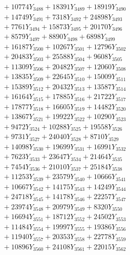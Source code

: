 \documentclass[a4paper,10pt]{article}
\begin{document}
{\begin{align}
&\;  + 10774 Y_{3488} + 18391 Y_{3489} + 18919 Y_{3490} \\[0.3ex]
&\;  + 14749 Y_{3491} + 7318 Y_{3492} + 24898 Y_{3493} \\[0.3ex]
&\;  + 7761 Y_{3494} + 15873 Y_{3495} + 20170 Y_{3496} \\[0.3ex]
&\;  + 8579 Y_{3497} + 8890 Y_{3498} + 6898 Y_{3499} \\[0.3ex]
&\;  + 16187 Y_{3500} + 10267 Y_{3501} + 12796 Y_{3502} \\[0.3ex]
&\;  + 20483 Y_{3503} + 25588 Y_{3504} + 9608 Y_{3505} \\[0.3ex]
&\;  + 11309 Y_{3506} + 20482 Y_{3507} + 12060 Y_{3508} \\[0.5ex]\allowbreak
&\;  + 13835 Y_{3509} + 22645 Y_{3510} + 15009 Y_{3511} \\[0.3ex]
&\;  + 15389 Y_{3512} + 20432 Y_{3513} + 13587 Y_{3514} \\[0.3ex]
&\;  + 16164 Y_{3515} + 17885 Y_{3516} + 21722 Y_{3517} \\[0.3ex]
&\;  + 17877 Y_{3518} + 16605 Y_{3519} + 14482 Y_{3520} \\[0.3ex]
&\;  + 13867 Y_{3521} + 19922 Y_{3522} + 10290 Y_{3523} \\[0.3ex]
&\;  + 9472 Y_{3524} + 10288 Y_{3525} + 19558 Y_{3526} \\[0.3ex]
&\;  + 9731 Y_{3527} + 24040 Y_{3528} + 8710 Y_{3529} \\[0.3ex]
&\;  + 14098 Y_{3530} + 19699 Y_{3531} + 16991 Y_{3532} \\[0.3ex]
&\;  + 7623 Y_{3533} + 23647 Y_{3534} + 21464 Y_{3535} \\[0.3ex]
&\;  + 7454 Y_{3536} + 21010 Y_{3537} + 25184 Y_{3538} \\[0.5ex]\allowbreak
&\;  + 11253 Y_{3539} + 23579 Y_{3540} + 10666 Y_{3541} \\[0.3ex]
&\;  + 10667 Y_{3542} + 14175 Y_{3543} + 14249 Y_{3544} \\[0.3ex]
&\;  + 24718 Y_{3545} + 14178 Y_{3546} + 22257 Y_{3547} \\[0.3ex]
&\;  + 23974 Y_{3548} + 20979 Y_{3549} + 8320 Y_{3550} \\[0.3ex]
&\;  + 16694 Y_{3551} + 18712 Y_{3552} + 24502 Y_{3553} \\[0.3ex]
&\;  + 11484 Y_{3554} + 19997 Y_{3555} + 19386 Y_{3556} \\[0.3ex]
&\;  + 11940 Y_{3557} + 20353 Y_{3558} + 22778 Y_{3559} \\[0.3ex]
&\;  + 10896 Y_{3560} + 24108 Y_{3561} + 22015 Y_{3562} \\[0.3ex]

\end{align}}
\end{document}
